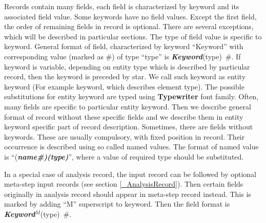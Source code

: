 \documentclass[a4paper]{article}
\newcommand{\fieldVal}[2]{\mbox{({\it\bf{#1}\#)\tiny (#2)}}}
\newcommand{\keywordnotype}[1]{\mbox{{\it{\bf{#1}}}}}
\newcommand{\keyword}[2]{\mbox{{\keywordnotype{#1}\tiny (#2)}}}
\newcommand{\entKeywordInst}[1]{\mbox{{\bf{{#1}}}}}
\newcommand{\field}[2]{\mbox{\keyword{#1}{#2}~\#}}
\begin{document}
Records contain many fields, each field is characterized by
keyword and its associated  field value. Some keywords have no field  values.
Except the first field, the order of remaining fields in record is
optional. There are several
exceptions, which will be described in particular sections.
The type of field value is specific to  keyword.
General format of field, characterized by keyword ``Keyword'' with
corresponding value (marked as \#) of type ``type'' is
\field{Keyword}{type}.
If keyword is variable, depending on entity type which is
described by particular record, then the keyword is preceded by star. We call such keyword
as entity keyword (For example keyword, which  describes  element
type). The possible
substitutions for entity keyword are typed using
\entKeywordInst{Typewriter} font family.
Often, many fields are specific to particular entity keyword. Then we describe
general format of record without these specific fields and we describe
them in entity keyword specific part of record description.
Sometimes, there are fields without keywords. These are usually
compulsory, with fixed position in record. Their occurrence is
described using so called named values. The format of named value is
``\fieldVal{name}{type}'', where a value of required type should be
substituted.

In a special case of analysis record, the input record can be followed
by optional meta-step input records (see section
\ref{_AnalysisRecord}). Then certain fields originally in analysis
record should appear in meta-step record instead. This is marked by
adding ``M'' superscript to keyword. Then the field format is \field{Keyword$^M$}{type}.
\end{document}
